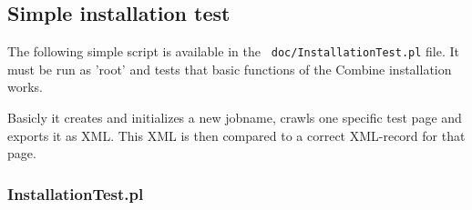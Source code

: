 \subsection{Simple installation test}
\label{InstTest}

The following simple script is available in the {\tt
doc/InstallationTest.pl} file. It must be run as 'root' 
and tests that basic functions of the Combine installation works.

Basicly it creates and initializes a new jobname, crawls one
specific test page and exports it as XML. This XML is then
compared to a correct XML-record for that page. 

\subsubsection{InstallationTest.pl}
